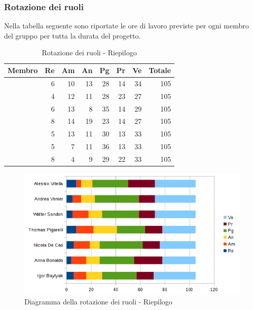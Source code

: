 \documentclass[12pt,a4paper]{article}
\begin{document}
\subsubsection{Rotazione dei ruoli}
Nella tabella seguente sono riportate le ore di lavoro previste per ogni membro del gruppo per tutta la durata del progetto.

\begin{table}[H]
	\begin{center}
		\begin{tabular}{l r r r r r r r}
			\toprule
			\textbf{Membro}	&	\textbf{Re}	&	\textbf{Am}	& \textbf{An} & \textbf{Pg} & \textbf{Pr} & \textbf{Ve} & \textbf{Totale}\\
			\midrule
			\midrule
			\IB{} & 6 & 10 & 13 & 28 & 14 & 34 & 105 \\
			\midrule
			\AB{} & 4 & 12 & 11 & 28 & 23 & 27 & 105 \\
			\midrule
			\NDC{} & 6 & 13 & 8 & 35 & 14 & 29 & 105 \\
			\midrule
			\TP{} & 8 & 14 & 19 & 23 & 14 & 27 & 105 \\
			\midrule
			\WS{} & 5 & 13 & 11 & 30 & 13 & 33 & 105 \\
			\midrule
			\AVE{} & 5 & 7 & 11 & 36 & 13 & 33 & 105 \\
			\midrule
			\AVI{} & 8 & 4 & 9 & 29 & 22 & 33 & 105 \\
			\bottomrule
		\end{tabular}
		\caption{Rotazione dei ruoli - Riepilogo}
	\end{center}
\end{table}

\begin{center}
	\begin{figure}[H]
		\centering \includegraphics[width=\textwidth]{../img/diagrammaBarreRiepilogoRotazioneRuoli.png}
		\caption{Diagramma della rotazione dei ruoli - Riepilogo}
	\end{figure}
\end{center}
\end{document}

